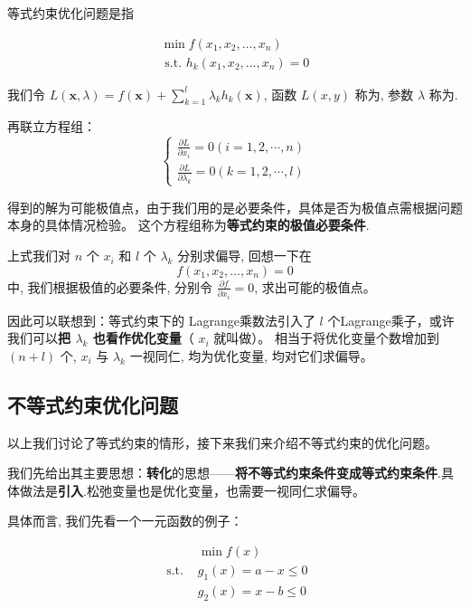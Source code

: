 等式约束优化问题是指

\begin{problem}[等式约束优化问题]
    $$
\begin{array}{l}
\min f\left(x_{1}, x_{2}, \ldots, x_{n}\right) \\
\text { s.t. } h_{k}\left(x_{1}, x_{2}, \ldots, x_{n}\right)=0
\end{array}
$$
\end{problem}


我们令 $ L(\mathbf{x}, \lambda)=f(\mathbf{x})+\sum_{k=1}^{l} \lambda_{k} h_{k}(\mathbf{x}) $, 函数 $ L(x, y) $ 称为, 参数 $ \lambda $ 称为.

再联立方程组： 
$$ \left\{\begin{array}{l}\frac{\partial L}{\partial x_{i}}=0(i=1,2, \cdots, n) \\ \frac{\partial L}{\partial \lambda_{k}}=0(k=1,2, \cdots, l)\end{array}\right. $$

得到的解为可能极值点，由于我们用的是必要条件，具体是否为极值点需根据问题本身的具体情况检验。 这个方程组称为\textbf{等式约束的极值必要条件}.

上式我们对 $ n $ 个 $ x_{i} $ 和 $ l $ 个 $ \lambda_{k} $ 分别求偏导, 回想一下在 
$$ f\left(x_{1}, x_{2}, \ldots, x_{n}\right)=0 $$ 
中, 我们根据极值的必要条件, 分别令 $ \frac{\partial f}{\partial x_{i}}=0 $, 求出可能的极值点。 

因此可以联想到：等式约束下的 Lagrange乘数法引入了 $ l $ 个Lagrange乘子，或许我们可以\textbf{把 $ \lambda_{k} $ 也看作优化变量}（ $ x_{i} $ 就叫做）。 相当于将优化变量个数增加到 $ (n+l) $ 个, $ x_{i} $ 与 $ \lambda_{k} $ 一视同仁, 均为优化变量, 均对它们求偏导。

\subsection{不等式约束优化问题}

以上我们讨论了等式约束的情形，接下来我们来介绍不等式约束的优化问题。

我们先给出其主要思想：\textbf{转化}的思想——\textbf{将不等式约束条件变成等式约束条件}.具体做法是\textbf{引入}.松弛变量也是优化变量，也需要一视同仁求偏导。

具体而言, 我们先看一个一元函数的例子：

\begin{example}
    $$\begin{aligned}
        &\min f(x)\\
    \text { s.t. }& g_{1}(x)=a-x \leq 0\\
    &g_{2}(x)=x-b \leq 0
    \end{aligned} $$
\end{example}

